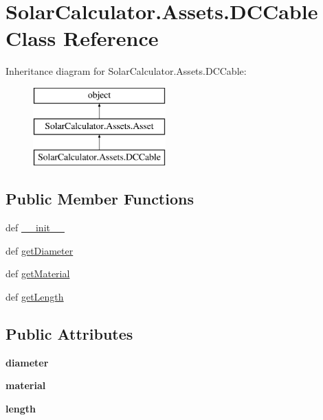 \hypertarget{class_solar_calculator_1_1_assets_1_1_d_c_cable}{\section{Solar\-Calculator.\-Assets.\-D\-C\-Cable Class Reference}
\label{class_solar_calculator_1_1_assets_1_1_d_c_cable}
}
Inheritance diagram for Solar\-Calculator.\-Assets.\-D\-C\-Cable\-:\begin{figure}[H]
\begin{center}
\leavevmode
\includegraphics[height=3.000000cm]{class_solar_calculator_1_1_assets_1_1_d_c_cable}
\end{center}
\end{figure}
\subsection*{Public Member Functions}
\begin{DoxyCompactItemize}
\item 
def \hyperlink{class_solar_calculator_1_1_assets_1_1_d_c_cable_a53e9ec02c8c597b05cfb280ff0da92c0}{\-\_\-\-\_\-init\-\_\-\-\_\-}
\item 
def \hyperlink{class_solar_calculator_1_1_assets_1_1_d_c_cable_a4d52e6c35f40178121b3585fa795fb2d}{get\-Diameter}
\item 
def \hyperlink{class_solar_calculator_1_1_assets_1_1_d_c_cable_a7e8829925d4fbddcc539b4e9e11b9b2e}{get\-Material}
\item 
def \hyperlink{class_solar_calculator_1_1_assets_1_1_d_c_cable_ac9e2126476baef0796dcb2df6199ab69}{get\-Length}
\end{DoxyCompactItemize}
\subsection*{Public Attributes}
\begin{DoxyCompactItemize}
\item 
\hypertarget{class_solar_calculator_1_1_assets_1_1_d_c_cable_a933bfa975df943e7ea9acb3e8a75d25b}{{\bfseries diameter}}\label{class_solar_calculator_1_1_assets_1_1_d_c_cable_a933bfa975df943e7ea9acb3e8a75d25b}

\item 
\hypertarget{class_solar_calculator_1_1_assets_1_1_d_c_cable_a29759ca3145f1a2f4e70e38ea86ed103}{{\bfseries material}}\label{class_solar_calculator_1_1_assets_1_1_d_c_cable_a29759ca3145f1a2f4e70e38ea86ed103}

\item 
\hypertarget{class_solar_calculator_1_1_assets_1_1_d_c_cable_a25b089925a6c80aba49e19f760046e44}{{\bfseries length}}\label{class_solar_calculator_1_1_assets_1_1_d_c_cable_a25b089925a6c80aba49e19f760046e44}

\end{DoxyCompactItemize}
